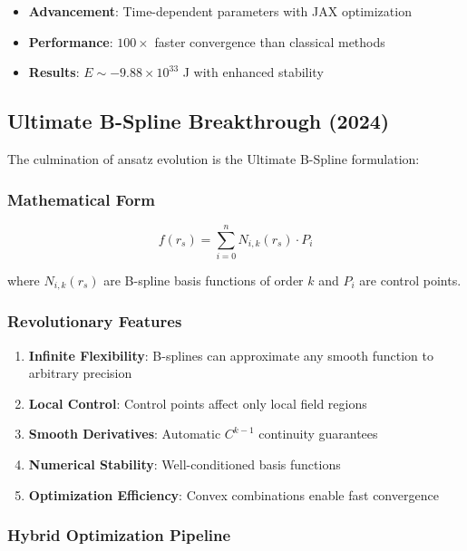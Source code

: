 \begin{itemize}
\item \textbf{Advancement}: Time-dependent parameters with JAX optimization
\item \textbf{Performance}: $100\times$ faster convergence than classical methods
\item \textbf{Results}: $E \sim -9.88 \times 10^{33}$ J with enhanced stability
\end{itemize}

\subsection{Ultimate B-Spline Breakthrough (2024)}

The culmination of ansatz evolution is the Ultimate B-Spline formulation:

\subsubsection{Mathematical Form}
\begin{equation}
f(r_s) = \sum_{i=0}^{n} N_{i,k}(r_s) \cdot P_i
\end{equation}

where $N_{i,k}(r_s)$ are B-spline basis functions of order $k$ and $P_i$ are control points.

\subsubsection{Revolutionary Features}

\begin{enumerate}
\item \textbf{Infinite Flexibility}: B-splines can approximate any smooth function to arbitrary precision
\item \textbf{Local Control}: Control points affect only local field regions
\item \textbf{Smooth Derivatives}: Automatic $C^{k-1}$ continuity guarantees
\item \textbf{Numerical Stability}: Well-conditioned basis functions
\item \textbf{Optimization Efficiency}: Convex combinations enable fast convergence
\end{enumerate}

\subsubsection{Hybrid Optimization Pipeline}

